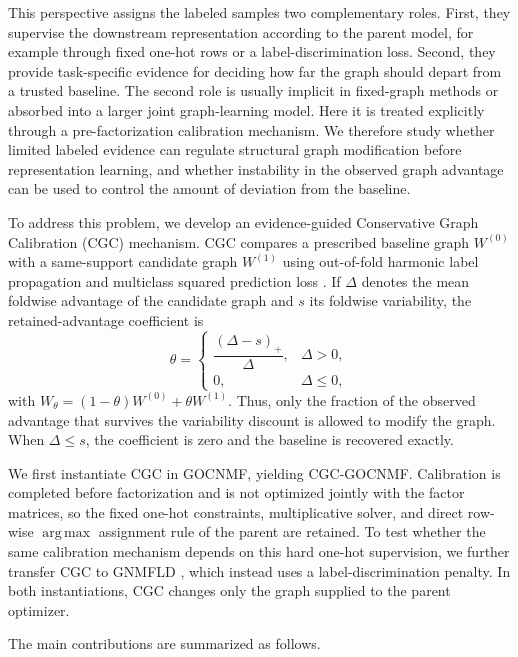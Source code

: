 \documentclass[11pt]{article}
\theoremstyle{remark}
\newcommand{\argmaxop}{\operatorname*{arg\,max}}
\begin{document}
This perspective assigns the labeled samples two complementary roles. First, they supervise the downstream representation according to the parent model, for example through fixed one-hot rows or a label-discrimination loss. Second, they provide task-specific evidence for deciding how far the graph should depart from a trusted baseline. The second role is usually implicit in fixed-graph methods or absorbed into a larger joint graph-learning model. Here it is treated explicitly through a pre-factorization calibration mechanism. We therefore study whether limited labeled evidence can regulate structural graph modification before representation learning, and whether instability in the observed graph advantage can be used to control the amount of deviation from the baseline.

To address this problem, we develop an evidence-guided Conservative Graph Calibration (CGC) mechanism. CGC compares a prescribed baseline graph $W^{(0)}$ with a same-support candidate graph $W^{(1)}$ using out-of-fold harmonic label propagation \cite{Zhu2003Harmonic} and multiclass squared prediction loss \cite{Brier1950}. If $\Delta$ denotes the mean foldwise advantage of the candidate graph and $s$ its foldwise variability, the retained-advantage coefficient is
\[
\theta=
\begin{cases}
\dfrac{(\Delta-s)_{+}}{\Delta},&\Delta>0,\\[1mm]
0,&\Delta\le0,
\end{cases}
\]
with $W_{\theta}=(1-\theta)W^{(0)}+\theta W^{(1)}$.
Thus, only the fraction of the observed advantage that survives the variability discount is allowed to modify the graph. When $\Delta\le s$, the coefficient is zero and the baseline is recovered exactly.

We first instantiate CGC in GOCNMF, yielding CGC-GOCNMF. Calibration is completed before factorization and is not optimized jointly with the factor matrices, so the fixed one-hot constraints, multiplicative solver, and direct row-wise $\argmaxop$ assignment rule of the parent are retained. To test whether the same calibration mechanism depends on this hard one-hot supervision, we further transfer CGC to GNMFLD \cite{Xing2021GNMFLD}, which instead uses a label-discrimination penalty. In both instantiations, CGC changes only the graph supplied to the parent optimizer.

The main contributions are summarized as follows.
\end{document}
